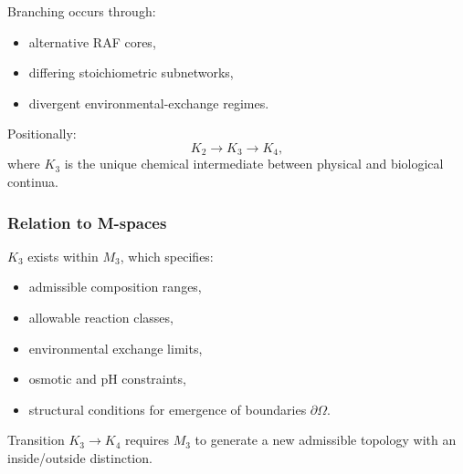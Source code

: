 Branching occurs through:
\begin{itemize}
    \item alternative RAF cores,
    \item differing stoichiometric subnetworks,
    \item divergent environmental-exchange regimes.
\end{itemize}

Positionally:
\[
K_2 \to K_3 \to K_4,
\]
where $K_3$ is the unique chemical intermediate between physical and
biological continua.

\subsubsection{Relation to M-spaces}

$K_3$ exists within $M_3$, which specifies:
\begin{itemize}
    \item admissible composition ranges,
    \item allowable reaction classes,
    \item environmental exchange limits,
    \item osmotic and pH constraints,
    \item structural conditions for emergence of boundaries $\partial\Omega$.
\end{itemize}

Transition $K_3 \to K_4$ requires $M_3$ to generate a new admissible
topology with an inside/outside distinction.
